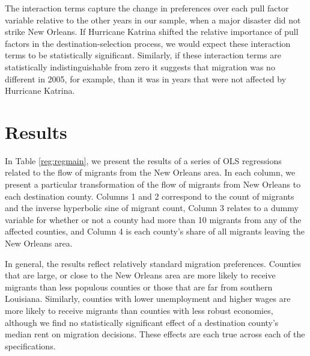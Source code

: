 \documentclass[]{article}
\begin{document}
The interaction terms capture the change in preferences over each pull
factor variable relative to the other years in our sample, when a major
disaster did not strike New Orleans. If Hurricane Katrina shifted the
relative importance of pull factors in the destination-selection
process, we would expect these interaction terms to be statistically
significant. Similarly, if these interaction terms are statistically
indistinguishable from zero it suggests that migration was no different
in 2005, for example, than it was in years that were not affected by
Hurricane Katrina.

\section{\texorpdfstring{Results
\label{sec:results}}{Results }}\label{results}

In Table \ref{reg:regmain}, we present the results of a series of OLS
regressions related to the flow of migrants from the New Orleans area.
In each column, we present a particular transformation of the flow of
migrants from New Orleans to each destination county. Columns 1 and 2
correspond to the count of migrants and the inverse hyperbolic sine of
migrant count, Column 3 relates to a dummy variable for whether or not a
county had more than 10 migrants from any of the affected counties, and
Column 4 is each county's share of all migrants leaving the New Orleans
area.

In general, the results reflect relatively standard migration
preferences. Counties that are large, or close to the New Orleans area
are more likely to receive migrants than less populous counties or those
that are far from southern Louisiana. Similarly, counties with lower
unemployment and higher wages are more likely to receive migrants than
counties with less robust economies, although we find no statistically
significant effect of a destination county's median rent on migration
decisions. These effects are each true across each of the
specifications.
\end{document}
